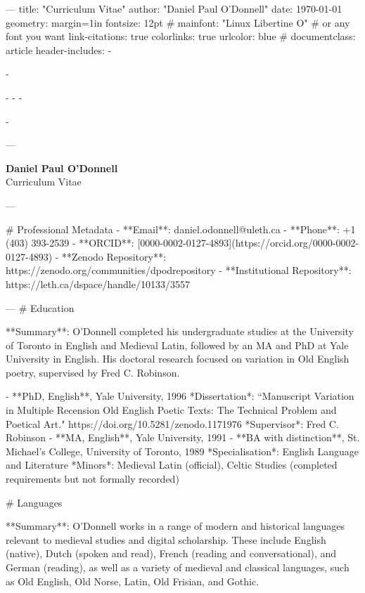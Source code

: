 ---
title: "Curriculum Vitae"
author: "Daniel Paul O'Donnell"
date: \today
geometry: margin=1in
fontsize: 12pt
# mainfont: "Linux Libertine O" # or any font you want
link-citations: true
colorlinks: true
urlcolor: blue
# documentclass: article
header-includes:
  - \usepackage[hyphens]{url}
  - \usepackage{hyperref}
  - \hypersetup{breaklinks=true}
  - 
  - \usepackage{needspace}
  - \newcommand{\sectionbreak}{\needspace{5\baselineskip}}

---



\begin{center}
\LARGE \textbf{Daniel Paul O'Donnell} \\
\vspace{0.25em}
\normalsize Curriculum Vitae
\end{center}

\sectionbreak{}
---

# Professional Metadata
- **Email**: daniel.odonnell@uleth.ca
- **Phone**: +1 (403) 393-2539
- **ORCID**: [0000-0002-0127-4893](https:/\allowbreak{}/\allowbreak{}orcid.org/\allowbreak{}0000-0002-0127-4893)
- **Zenodo Repository**: https:/\allowbreak{}/\allowbreak{}zenodo.org/\allowbreak{}communities/\allowbreak{}dpodrepository
- **Institutional Repository**: https:/\allowbreak{}/\allowbreak{}leth.ca/\allowbreak{}dspace/\allowbreak{}handle/\allowbreak{}10133/\allowbreak{}3557

\sectionbreak{}
---
# Education

**Summary**: O'Donnell completed his undergraduate studies at the University of Toronto in English and Medieval Latin, followed by an MA and PhD at Yale University in English. His doctoral research focused on variation in Old English poetry, supervised by Fred C. Robinson.

- **PhD, English**, Yale University, 1996
  *Dissertation*: “Manuscript Variation in Multiple Recension Old English Poetic Texts: The Technical Problem and Poetical Art."  https:/\allowbreak{}/\allowbreak{}doi.org/\allowbreak{}10.5281/\allowbreak{}zenodo.1171976
  *Supervisor*: Fred C. Robinson
- **MA, English**, Yale University, 1991
- **BA with distinction**, St. Michael’s College, University of Toronto, 1989
  *Specialisation*: English Language and Literature
  *Minors*: Medieval Latin (official), Celtic Studies (completed requirements but not formally recorded)

\sectionbreak{}
# Languages

**Summary**: O'Donnell works in a range of modern and historical languages relevant to medieval studies and digital scholarship. These include English (native), Dutch (spoken and read), French (reading and conversational), and German (reading), as well as a variety of medieval and classical languages, such as Old English, Old Norse, Latin, Old Frisian, and Gothic.

